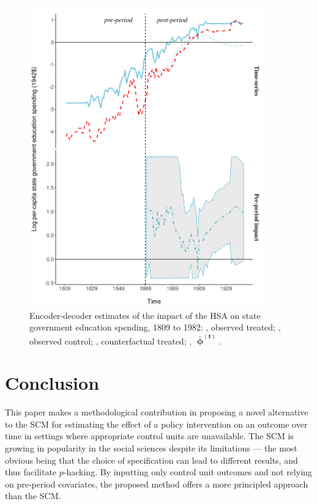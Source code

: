 \begin{figure}[htbp]
	\centering
	\includegraphics[width=0.9\textwidth]{plots/educ-ed.png}
	\caption{Encoder-decoder estimates of the impact of the HSA on state government education spending, 1809 to 1982:		{\color{Darjeeling15}{\sampleline{}}}, observed treated;
		{}, observed control;
		{}, counterfactual treated;
		{}, $\boldsymbol{\bar{\upphi}^{(t)}}$.\label{educ-ed}} 
\end{figure}

\section{Conclusion} \label{conclusion}

This paper makes a methodological contribution in proposing a novel alternative to the SCM for estimating the effect of a policy intervention on an outcome over time in settings where appropriate control units are unavailable. The SCM is growing in popularity in the social sciences despite its limitations --- the most obvious being that the choice of specification can lead to different results, and thus facilitate $p$-hacking. By inputting only control unit outcomes and not relying on pre-period covariates, the proposed method offers a more principled approach than the SCM. 

